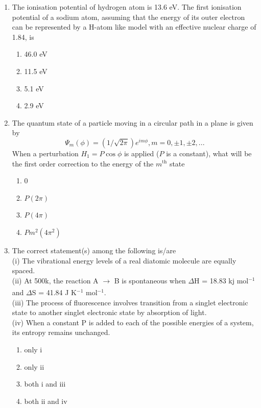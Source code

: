 \documentclass[journal,12pt,onecolumn]{IEEEtran}
\theoremstyle{remark}
\begin{document}
\begin{enumerate}
\item  The ionisation potential of hydrogen atom is 13.6 eV. The first ionisation potential of a sodium atom, assuming that the energy of its outer electron can be represented by a H-atom like model with an effective nuclear charge of 1.84, is\hfill{}
\begin{multicols}{2}
\begin{enumerate} 
    \item 46.0 eV
    \item 11.5 eV
    \item 5.1 eV
    \item 2.9 eV
\end{enumerate}
\end{multicols}

\item  The quantum state of a particle moving in a circular path in a plane is given by
\[
\Psi_{m}(\phi) = (1/\sqrt{2\pi})e^{im\phi}, m=0,\pm1,\pm2,...
\]
When a perturbation $H_1 = P \cos \phi$ is applied ($P$ is a constant), what will be the first order correction to the energy of the $m^\text{th}$ state\hfill{}
\begin{multicols}{2}
\begin{enumerate} 
    \item 0
    \item $P(2\pi)$
    \item $P(4\pi)$
    \item $Pm^2(4\pi^2)$
\end{enumerate}
\end{multicols}
  

 \item  The correct statement(s) among the following is/are \\
(i) The vibrational energy levels of a real diatomic molecule are equally spaced. \\
(ii) At 500k, the reaction A $\xrightarrow[ ]{ }$ B is spontaneous when $\Delta $H = 18.83 kj mol$^{-1}$ and $\Delta $S  = 41.84 J K$^{-1}$ mol$^{-1}$. \\
(iii) The process of fluorescence involves transition from a singlet electronic state to another singlet electronic state by absorption of light. \\
(iv) When a constant P is added to each of the possible energies of a system, its entropy remains unchanged. \\
\hfill{}
\begin{multicols}{2}
\begin{enumerate} 
    \item only i
    \item only ii
    \item both i and iii
    \item both ii and iv
\end{enumerate}
\end{multicols}


\end{enumerate}
\end{document}

